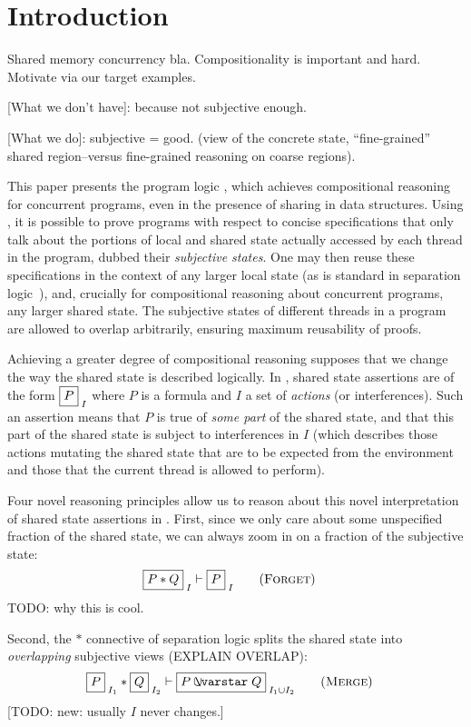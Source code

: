 \section{Introduction}

Shared memory concurrency bla.  Compositionality is important and
hard. Motivate via our target examples.

[What we don't have]: because not subjective enough.

[What we do]: subjective = good. (view of the concrete state,
``fine-grained'' shared region--versus fine-grained reasoning on
coarse regions).

This paper presents the program logic \colosl, which achieves
compositional reasoning for concurrent programs, even in the presence
of sharing in data structures.  Using \colosl, it is possible to prove
programs with respect to concise specifications that only talk about
the portions of local and shared state actually accessed by each
thread in the program, dubbed their \emph{subjective states}.  One may
then reuse these specifications in the context of any larger local
state (as is standard in separation logic~\cite{rey02}), and,
crucially for compositional reasoning about concurrent programs, any
larger shared state. The subjective states of different threads in a
program are allowed to overlap arbitrarily, ensuring maximum
reusability of proofs.


Achieving a greater degree of compositional reasoning supposes that we
change the way the shared state is described logically.  In \colosl,
shared state assertions are of the form $\shared P I$ where $P$ is a
formula and $I$ a set of \emph{actions} (or interferences). Such an
assertion means that $P$ is true of \emph{some part} of the shared
state, and that this part of the shared state is subject to
interferences in $I$ (which describes those actions mutating the
shared state that are to be expected from the environment and those
that the current thread is allowed to perform).

Four novel reasoning principles allow us to reason about this novel
interpretation of shared state assertions in \colosl. First, since we
only care about some unspecified fraction of the shared state, we can
always  zoom in on a fraction of the subjective state:
\begin{align*}
  \shared{P * Q}{I} &\vdash \shared{P}{I}  \tag{\textsc{Forget}}
\end{align*}
TODO: why this is cool.

Second, the $*$ connective of separation logic splits the shared state
into \emph{overlapping} subjective views (EXPLAIN OVERLAP):
\begin{align*}
  \shared{P}{I_1} * \shared{Q}{I_2} &\vdash \shared{P \sepish Q}{I_1 \cup I_2} \tag{\textsc{Merge}}
\end{align*}
[TODO: new: usually $I$ never changes.]

